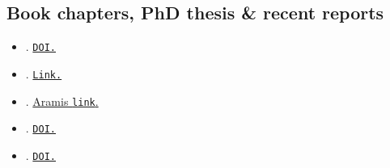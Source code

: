 \documentclass[12pt,a4paper]{moderncv}
\begin{document}
 \subsection{Book chapters, PhD thesis \& recent reports}
 \begin{itemize}[leftmargin=2.75cm,itemsep=2pt]

   \item{}. \href{https://doi.org/10.17605/OSF.IO/Z5R26}{\texttt{DOI.}}
\item{}. \href{https://www.economicswebinstitute.org/books/ssh-contributions%20to%20the%20energy%20research%20debate-a4.pdf}{\texttt{Link.}}
\item{}. \href{https://aramis.admin.ch/Texte/?ProjectID=41021}{Aramis \texttt{link}.}
 \item{}. \href{https://www.doi.org/10.3929/ethz-b-000476614}{\texttt{DOI.}}
 \item{}. \href{https://www.doi.org/10.3929/ethz-b-000512355}{\texttt{DOI.}}
  
\end{itemize}
\end{document}
